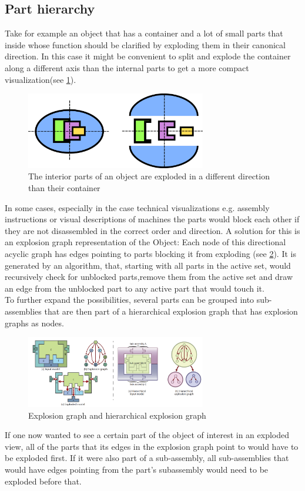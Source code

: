 \subsection{Part hierarchy}
Take for example an object that has a container and a lot of small parts that inside whose function should be clarified by exploding them in their canonical direction.  In this case it might be convenient to split and explode the container along a different axis than the internal parts to get a more compact visualization(see \ref{fig:axes}).\\
\begin{figure}[tb]
	\centering
	\includegraphics[width=0.7\textwidth]{chapters/figures/axes}
	\caption{The interior parts of an object are exploded in a different direction than their container}
	\label{fig:axes}
\end{figure}
In some cases, especially in the case technical visualizations e.g. assembly instructions or visual descriptions of machines the parts would block each other if they are not disassembled in the correct order and direction. A solution for this is an explosion graph representation of the Object\cite{proc:Li:2008:AGI}: Each node of this directional acyclic graph has edges pointing to parts blocking it from exploding (see \ref{fig:hierarchy}). It is generated by an algorithm, that, starting with all parts in the active set, would recursively check for unblocked parts,remove them from the active set and draw an edge from the unblocked part to any active part that would touch it.\\
To further expand the possibilities, several parts can be grouped into sub-assemblies that are then part of a hierarchical explosion graph that has explosion graphs as nodes.\\
\begin{figure}[tb]
	\centering
	\includegraphics[width=0.7\textwidth]{chapters/figures/hierarchy}
	\caption{Explosion graph and hierarchical explosion graph\cite{proc:Li:2008:AGI}}
	\label{fig:hierarchy}
\end{figure}
If one now wanted to see a certain part of the object of interest in an exploded view, all of the parts that its edges in the explosion graph point to would have to be exploded first. If it were also part of a sub-assembly, all sub-assemblies that would have edges pointing from the part's subassembly would need to be exploded before that.

